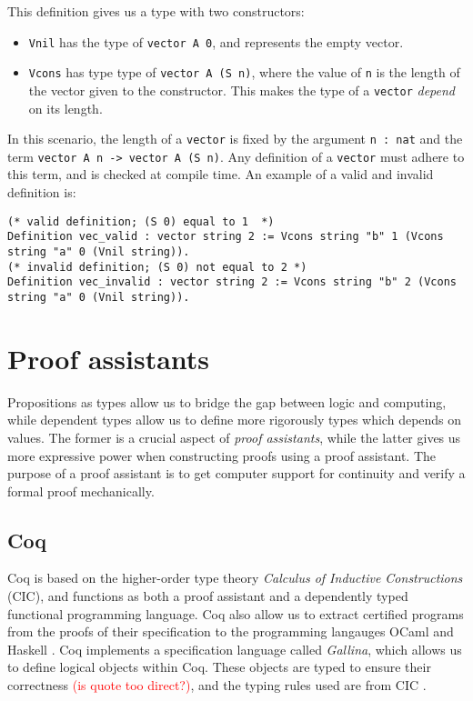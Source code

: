 This definition gives us a type with two constructors:

\begin{itemize}
    \item
        \lstinline{Vnil} has the type of \lstinline{vector A 0}, and represents the empty vector.
    \item
        \lstinline{Vcons} has type type of \lstinline{vector A (S n)}, where the value of \lstinline{n} 
                            is the length of the vector given to the constructor.
                            This makes the type of a \lstinline{vector} \textit{depend} on its length.
\end{itemize}

In this scenario, the length of a \lstinline{vector} is fixed by the argument \lstinline{n : nat}
and the term \lstinline{vector A n -> vector A (S n)}.
Any definition of a \lstinline{vector} must adhere to this term, and is checked at compile time.
An example of a valid and invalid definition is:

\begin{minipage}{\linewidth}
\begin{lstlisting}[language=Coq, label={lst:dep_type_vec_ex}, caption={Examples of vectors in Coq}]
(* valid definition; (S 0) equal to 1  *)
Definition vec_valid : vector string 2 := Vcons string "b" 1 (Vcons string "a" 0 (Vnil string)).
(* invalid definition; (S 0) not equal to 2 *)
Definition vec_invalid : vector string 2 := Vcons string "b" 2 (Vcons string "a" 0 (Vnil string)).
\end{lstlisting}
\end{minipage}

\section{Proof assistants}

Propositions as types allow us to bridge the gap between logic and computing,
while dependent types allow us to define more rigorously types which depends on values.
The former is a crucial aspect of \textit{proof assistants}, while the latter gives
us more expressive power when constructing proofs using a proof assistant.
The purpose of a proof assistant is to get computer support for continuity and verify a formal proof mechanically.

\subsection{Coq}
Coq is based on the higher-order type theory \textit{Calculus of Inductive Constructions} (CIC), and
functions as both a proof assistant and a dependently typed functional programming language.
Coq also allow us to extract certified programs from the proofs of their specification to
the programming langauges OCaml and Haskell \cite{cintro}.
Coq implements a specification language called \textit{Gallina},
which allows us to define logical objects within Coq.
These objects are typed to ensure their correctness \textcolor{red}{(is quote too direct?)},
and the typing rules used are from CIC \cite{cic}.

